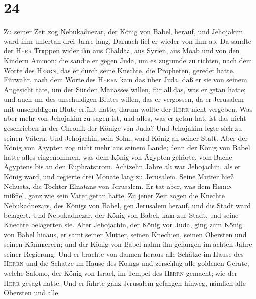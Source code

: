 \hypertarget{section-23}{%
\section{24}\label{section-23}}

 Zu seiner Zeit zog Nebukadnezar, der König von Babel,
herauf, und Jehojakim ward ihm untertan drei Jahre lang. Darnach fiel er
wieder von ihm ab.  Da sandte der \textsc{Herr} Truppen
wider ihn aus Chaldäa, aus Syrien, aus Moab und von den Kindern Ammon;
die sandte er gegen Juda, um es zugrunde zu richten, nach dem Worte des
\textsc{Herrn}, das er durch seine Knechte, die Propheten, geredet
hatte.  Fürwahr, nach dem Worte des \textsc{Herrn} kam das
über Juda, daß er sie von seinem Angesicht täte, um der Sünden Manasses
willen, für all das, was er getan hatte;  und auch um des
unschuldigen Blutes willen, das er vergossen, da er Jerusalem mit
unschuldigem Blute erfüllt hatte; darum wollte der \textsc{Herr} nicht
vergeben.  Was aber mehr von Jehojakim zu sagen ist, und
alles, was er getan hat, ist das nicht geschrieben in der Chronik der
Könige von Juda?  Und Jehojakim legte sich zu seinen
Vätern. Und Jehojachin, sein Sohn, ward König an seiner Statt.
 Aber der König von Ägypten zog nicht mehr aus seinem
Lande; denn der König von Babel hatte alles eingenommen, was dem König
von Ägypten gehörte, vom Bache Ägyptens bis an den Euphratstrom.
 Achtzehn Jahre alt war Jehojachin, als er König ward, und
regierte drei Monate lang zu Jerusalem. Seine Mutter hieß Nehusta, die
Tochter Elnatans von Jerusalem.  Er tat aber, was dem
\textsc{Herrn} mißfiel, ganz wie sein Vater getan hatte. 
Zu jener Zeit zogen die Knechte Nebukadnezars, des Königs von Babel, gen
Jerusalem herauf, und die Stadt ward belagert.  Und
Nebukadnezar, der König von Babel, kam zur Stadt, und seine Knechte
belagerten sie.  Aber Jehojachin, der König von Juda,
ging zum König von Babel hinaus, er samt seiner Mutter, seinen Knechten,
seinen Obersten und seinen Kämmerern; und der König von Babel nahm ihn
gefangen im achten Jahre seiner Regierung.  Und er
brachte von dannen heraus alle Schätze im Hause des \textsc{Herrn} und
die Schätze im Hause des Königs und zerschlug alle goldenen Geräte,
welche Salomo, der König von Israel, im Tempel des \textsc{Herrn}
gemacht; wie der \textsc{Herr} gesagt hatte.  Und er
führte ganz Jerusalem gefangen hinweg, nämlich alle Obersten und alle
